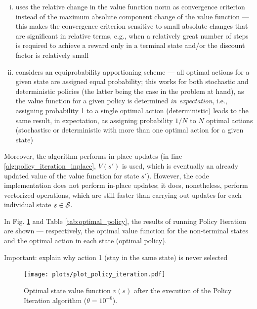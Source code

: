 \documentclass[a4paper]{article}
\begin{document}
\begin{enumerate}[i.]
\item uses the relative change in the value function norm as convergence criterion instead of the maximum absolute component change of the value function --- this makes the convergence criterion sensitive to small absolute changes that are significant in relative terms, e.g., when a relatively great number of steps is required to achieve a reward only in a terminal state and/or the discount factor is relatively small 
\item considers an equiprobability apportioning scheme --- all optimal actions for a given state are assigned equal probability; this works for both stochastic and deterministic policies (the latter being the case in the problem at hand), as the value function for a given policy is determined \textit{in expectation}, i.e., assigning probability 1 to a single optimal action (deterministic) leads to the same result, in expectation, as assigning probability $1/N$ to $N$ optimal actions (stochastisc or deterministic with more than one optimal action for a given state)
\end{enumerate}

Moreover, the algorithm performs in-place updates (in line \ref{alg:policy_iteration_inplace}, $V(s')$ is used, which is eventually an already updated value of the value function for state $s'$). However, the code implementation does not perform in-place updates; it does, nonetheless, perform vectorized operations, which are still faster than carrying out updates for each individual state $s \in {\cal S}$. 

In Fig. \ref{fig:policy_iteration} and Table \ref{tab:optimal_policy}, the results of running Policy Iteration are shown --- respectively, the optimal value function for the non-terminal states and the optimal action in each state (optimal policy).

Important: explain why action 1 (stay in the same state) is never selected

\begin{figure}[htbp]
\centering
\texttt{[image: plots/plot\_policy\_iteration.pdf]}
\caption{Optimal state value function $v(s)$ after the execution of the Policy Iteration algorithm ($\theta=10^{-6}$).}
\label{fig:policy_iteration}
\end{figure}
\end{document}
